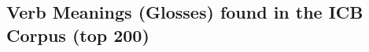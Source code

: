 \documentclass{article}
\begin{document}
\begin{figure}[H]
\end{figure}
\clearpage

\hypertarget{app:verbs}{%
\subsection{Verb Meanings (Glosses) found in the ICB Corpus (top
200)}\label{app:verbs}}

\hphantom{em}

\providecommand{\docline}[3]{\noalign{\global\setlength{\arrayrulewidth}{#1}}\arrayrulecolor[HTML]{#2}\cline{#3}}
\end{document}
